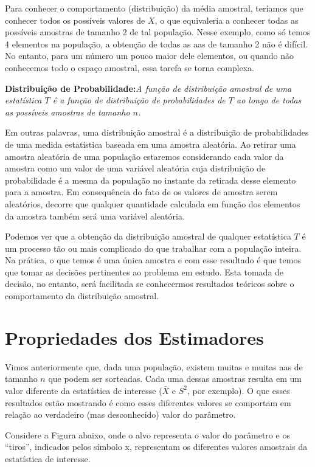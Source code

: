 \documentclass[
]{book}
\begin{document}
Para conhecer o comportamento (distribuição) da média amostral, teríamos que conhecer todos os possíveis valores de \(X\), o que equivaleria a conhecer todas as possíveis amostras de tamanho 2 de tal população. Nesse exemplo, como só temos 4 elementos na população, a obtenção de todas as aas de tamanho 2 não é difícil. No entanto, para um número um pouco maior dele elementos, ou quando não conhecemos todo o espaço amostral, essa tarefa se torna complexa.

\textbf{Distribuição de Probabilidade:}\emph{A função de distribuição amostral de uma estatística $T$ é a função de distribuição de probabilidades de $T$ ao longo de todas as possíveis amostras de tamanho $n$.}

Em outras palavras, uma distribuição amostral é a distribuição de probabilidades de uma medida estatística baseada em uma amostra aleatória. Ao retirar uma amostra aleatória de uma população estaremos considerando cada valor da amostra como um valor de uma variável aleatória cuja distribuição de probabilidade é a mesma da população no instante da retirada desse elemento para a amostra. Em consequência do fato de os valores de amostra serem aleatórios, decorre que qualquer quantidade calculada em função dos elementos da amostra também será uma variável aleatória.

Podemos ver que a obtenção da distribuição amostral de qualquer estatística \(T\) é um processo tão ou mais complicado do que trabalhar com a população inteira. Na prática, o que temos é uma única amostra e com esse resultado é que temos que tomar as decisões pertinentes ao problema em estudo. Esta tomada de decisão, no entanto, será facilitada se conhecermos resultados teóricos sobre o comportamento da distribuição amostral.

\hypertarget{propriedades-dos-estimadores}{%
\section{Propriedades dos Estimadores}\label{propriedades-dos-estimadores}}

Vimos anteriormente que, dada uma população, existem muitas e muitas aas de tamanho \(n\) que podem ser sorteadas. Cada uma dessas amostras resulta em um valor diferente da estatística de interesse (\(\bar X\) e \(S^2\), por exemplo). O que esses resultados estão mostrando é como esses diferentes valores se comportam em relação ao verdadeiro (mas desconhecido) valor do parâmetro.

Considere a Figura abaixo, onde o alvo representa o valor do parâmetro e os ``tiros'', indicados pelos símbolo x, representam os diferentes valores amostrais da estatística de interesse.
\end{document}
